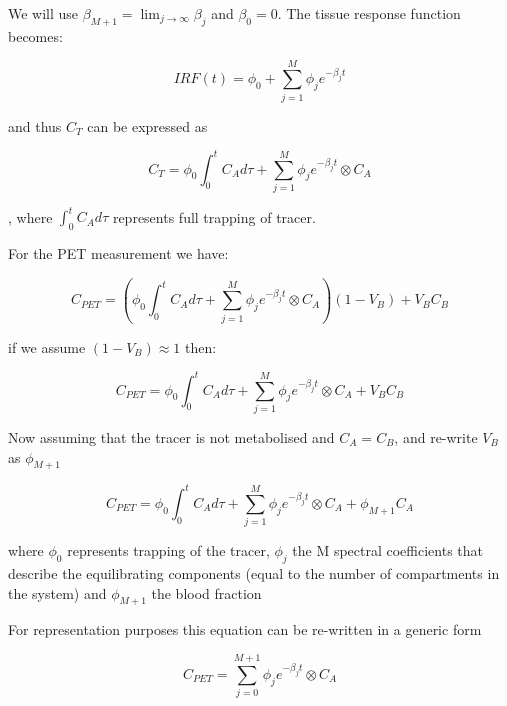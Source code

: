 \newline We will use $\beta_{M+1} = \lim_{j\to\infty} \beta_j$ and $\beta_0 = 0 $. 
The tissue response function becomes:

\begin{equation} \label{EqRE}
IRF(t) = \phi_0 + \sum_{j=1}^{M} \phi_j e^{-\beta_j t} 
\end{equation}

and thus $C_T$ can be expressed as 

\begin{equation} \label{EqRE}
C_{T}  = \phi_0  \int_{0}^{t}C_A  d\tau + \sum_{j=1}^{M} \phi_j e^{-\beta_j t} \otimes C_A 
\end{equation}

, where $\int_{0}^{t}C_A  d\tau$ represents full trapping of tracer.

For the PET measurement we have: 

\begin{equation} \label{EqRE}
C_{PET} = ( \phi_0  \int_{0}^{t}C_A  d\tau + \sum_{j=1}^{M} \phi_j e^{-\beta_j t} \otimes C_A  )(1-V_B) + V_B C_B
\end{equation}

\newline
if we assume  $(1-V_B)\approx1$ then:

\begin{equation} \label{EqRE}
C_{PET} = \phi_0\int_{0}^{t}C_Ad\tau  + \sum_{j=1}^{M} \phi_j e^{-\beta_j t} \otimes C_A  + V_B C_B
\end{equation}

Now assuming that the tracer is not metabolised and $C_A = C_B$, and re-write $V_B$ as $\phi_{M+1}$

\begin{equation} \label{EqRE}
C_{PET} = \phi_0\int_{0}^{t}C_Ad\tau  + \sum_{j=1}^{M} \phi_j e^{-\beta_j t} \otimes C_A  + \phi_{M+1} C_A
\end{equation}

\newline where $\phi_0$ represents trapping of the tracer, $\phi_j$ the M spectral coefficients that describe the equilibrating components (equal to the number of compartments in the system) and $\phi_{M+1}$ the blood fraction

For representation purposes this equation can be re-written in a generic form 

\begin{equation} \label{EqRE}
C_{PET} = \sum_{j=0}^{M+1} \phi_j e^{-\beta_j t} \otimes C_A 
\end{equation}
